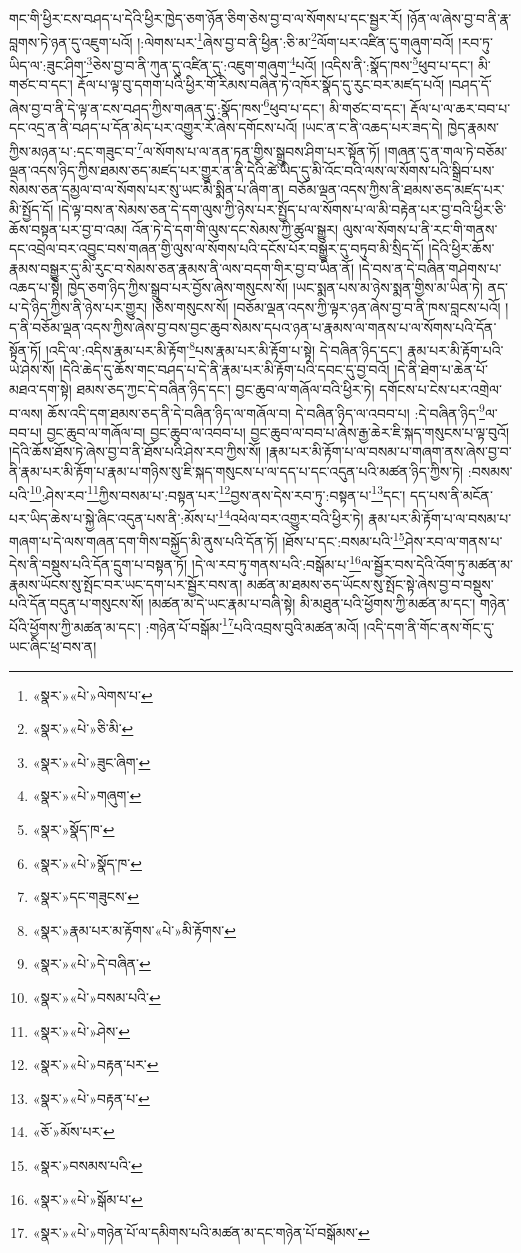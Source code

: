 གང་གི་ཕྱིར་ངས་བཤད་པ་དེའི་ཕྱིར་ཁྱེད་ཅག་ཉོན་ཅིག་ཅེས་བྱ་བ་ལ་སོགས་པ་དང་སྦྱར་རོ། །ཉོན་ལ་ཞེས་བྱ་བ་ནི་རྣ་བླགས་ཏེ་ཉན་དུ་འཇུག་པའོ། །:ལེགས་པར་\footnote{«སྣར་»«པེ་»ལེགས་པ་}ཞེས་བྱ་བ་ནི་ཕྱིན་:ཅི་མ་\footnote{«སྣར་»«པེ་»ཅི་མི་}ལོག་པར་འཛིན་དུ་གཞུག་བའོ། །རབ་ཏུ་ཡིད་ལ་:ཟུང་ཤིག་\footnote{«སྣར་»«པེ་»ཟུང་ཞིག་}ཅེས་བྱ་བ་ནི་ཀུན་དུ་འཛིན་དུ་:འཇུག་གཞུག་\footnote{«སྣར་»«པེ་»གཞུག་}པའོ། །འདིས་ནི་:སྣོད་ཁས་\footnote{«སྣར་»སྣོད་ཁ་}ཕུབ་པ་དང་། མི་གཙང་བ་དང་། རྡོལ་པ་ལྟ་བུ་དགག་པའི་ཕྱིར་གོ་རིམས་བཞིན་ཏེ་འཁོར་སྣོད་དུ་རུང་བར་མཛད་པའོ། །བཤད་དོ་ཞེས་བྱ་བ་ནི་དེ་ལྟ་ན་ངས་བཤད་ཀྱིས་གཞན་དུ་:སྣོད་ཁས་\footnote{«སྣར་»«པེ་»སྣོད་ཁ་}ཕུབ་པ་དང་། མི་གཙང་བ་དང་། རྡོལ་པ་ལ་ཆར་བབ་པ་དང་འདྲ་ན་ནི་བཤད་པ་དོན་མེད་པར་འགྱུར་རོ་ཞེས་དགོངས་པའོ། །ཡང་ན་ང་ནི་འཆད་པར་ཟད་དེ། ཁྱེད་རྣམས་ཀྱིས་མཉན་པ་:དང་གཟུང་བ་\footnote{«སྣར་»དང་གཟུངས་}ལ་སོགས་པ་ལ་ནན་ཏན་གྱིས་སྒྲུབས་ཤིག་པར་སྟོན་ཏོ། །གཞན་དུ་ན་གལ་ཏེ་བཅོམ་ལྡན་འདས་ཉིད་ཀྱིས་ཐམས་ཅད་མཛད་པར་གྱུར་ན་ནི་དེའི་ཚེ་ཡིད་དུ་མི་འོང་བའི་ལས་ལ་སོགས་པའི་སྒྲིབ་པས་སེམས་ཅན་དམྱལ་བ་ལ་སོགས་པར་སུ་ཡང་མི་སྨིན་པ་ཞིག་ན། བཅོམ་ལྡན་འདས་ཀྱིས་ནི་ཐམས་ཅད་མཛད་པར་མི་སྤྱོད་དོ། །དེ་ལྟ་བས་ན་སེམས་ཅན་དེ་དག་ལུས་ཀྱི་ཉེས་པར་སྤྱོད་པ་ལ་སོགས་པ་ལ་མི་བརྟེན་པར་བྱ་བའི་ཕྱིར་ཅི་ཆོས་བསྟན་པར་བྱ་བ་འམ། འོན་ཏེ་དེ་དག་གི་ལུས་དང་སེམས་ཀྱི་ཚུལ་སྒྱུར། ལུས་ལ་སོགས་པ་ནི་རང་གི་གནས་དང་འབྲེལ་བར་འབྱུང་བས་གཞན་གྱི་ལུས་ལ་སོགས་པའི་དངོས་པོར་བསྒྱུར་དུ་བཏུབ་མི་སྲིད་དོ། །དེའི་ཕྱིར་ཆོས་རྣམས་བསྒྱུར་དུ་མི་རུང་བ་སེམས་ཅན་རྣམས་ནི་ལས་བདག་གིར་བྱ་བ་ཡིན་ནོ། །དེ་བས་ན་དེ་བཞིན་གཤེགས་པ་འཆད་པ་སྟེ། ཁྱེད་ཅག་ཉིད་ཀྱིས་སྒྲུབ་པར་བྱོས་ཞེས་གསུངས་སོ། །ཡང་སྨན་པས་མ་ཉེས་སྨན་གྱིས་མ་ཡིན་ཏེ། ནད་པ་དེ་ཉིད་ཀྱིས་ནི་ཉེས་པར་གྱུར། །ཅེས་གསུངས་སོ། །བཅོམ་ལྡན་འདས་ཀྱི་ལྟར་ཉན་ཞེས་བྱ་བ་ནི་ཁས་བླངས་པའོ། །ད་ནི་བཅོམ་ལྡན་འདས་ཀྱིས་ཞེས་བྱ་བས་བྱང་ཆུབ་སེམས་དཔའ་ཉན་པ་རྣམས་ལ་གནས་པ་ལ་སོགས་པའི་དོན་སྟོན་ཏོ། །འདི་ལ་:འདིས་རྣམ་པར་མི་རྟོག་\footnote{«སྣར་»རྣམ་པར་མ་རྟོགས་«པེ་»མི་རྟོགས་}པས་རྣམ་པར་མི་རྟོག་པ་སྟེ། དེ་བཞིན་ཉིད་དང་། རྣམ་པར་མི་རྟོག་པའི་ཡེ་ཤེས་སོ། །དེའི་ཆེད་དུ་ཆོས་གང་བཤད་པ་དེ་ནི་རྣམ་པར་མི་རྟོག་པའི་དབང་དུ་བྱ་བའོ། །དེ་ནི་ཐེག་པ་ཆེན་པོ་མཐའ་དག་སྟེ། ཐམས་ཅད་ཀྱང་དེ་བཞིན་ཉིད་དང་། བྱང་ཆུབ་ལ་གཞོལ་བའི་ཕྱིར་ཏེ། དགོངས་པ་ངེས་པར་འགྲེལ་བ་ལས། ཆོས་འདི་དག་ཐམས་ཅད་ནི་དེ་བཞིན་ཉིད་ལ་གཞོལ་བ། དེ་བཞིན་ཉིད་ལ་འབབ་པ། :དེ་བཞིན་ཉིད་\footnote{«སྣར་»«པེ་»དེ་བཞིན་}ལ་བབ་པ། བྱང་ཆུབ་ལ་གཞོལ་བ། བྱང་ཆུབ་ལ་འབབ་པ། བྱང་ཆུབ་ལ་བབ་པ་ཞེས་རྒྱ་ཆེར་ཇི་སྐད་གསུངས་པ་ལྟ་བུའོ། །དེའི་ཆོས་ཐོས་ཏེ་ཞེས་བྱ་བ་ནི་ཐོས་པའི་ཤེས་རབ་ཀྱིས་སོ། །རྣམ་པར་མི་རྟོག་པ་ལ་བསམ་པ་གཞག་ནས་ཞེས་བྱ་བ་ནི་རྣམ་པར་མི་རྟོག་པ་རྣམ་པ་གཉིས་སུ་ཇི་སྐད་གསུངས་པ་ལ་དད་པ་དང་འདུན་པའི་མཚན་ཉིད་ཀྱིས་ཏེ། :བསམས་པའི་\footnote{«སྣར་»«པེ་»བསམ་པའི་}:ཤེས་རབ་\footnote{«སྣར་»«པེ་»ཤེས་}ཀྱིས་བསམ་པ་:བསྟན་པར་\footnote{«སྣར་»«པེ་»བརྟན་པར་}བྱས་ནས་དེས་རབ་ཏུ་:བསྟན་པ་\footnote{«སྣར་»«པེ་»བརྟན་པ་}དང་། དད་པས་ནི་མངོན་པར་ཡིད་ཆེས་པ་སྐྱེ་ཞིང་འདུན་པས་ནི་:མོས་པ་\footnote{«ཅོ་»མོས་པར་}འཕེལ་བར་འགྱུར་བའི་ཕྱིར་ཏེ། རྣམ་པར་མི་རྟོག་པ་ལ་བསམ་པ་གཞག་པ་དེ་ལས་གཞན་དག་གིས་བསྐྱོད་མི་ནུས་པའི་དོན་ཏོ། །ཐོས་པ་དང་:བསམ་པའི་\footnote{«སྣར་»བསམས་པའི་}ཤེས་རབ་ལ་གནས་པ་དེས་ནི་བསྡུས་པའི་དོན་དྲུག་པ་བསྟན་ཏོ། །དེ་ལ་རབ་ཏུ་གནས་པའི་:བསྒོམ་པ་\footnote{«སྣར་»«པེ་»སྒོམ་པ་}ལ་སྦྱོར་བས་དེའི་འོག་ཏུ་མཚན་མ་རྣམས་ཡོངས་སུ་སྤོང་བར་ཡང་དག་པར་སྦྱོར་བས་ན། མཚན་མ་ཐམས་ཅད་ཡོངས་སུ་སྤོང་སྟེ་ཞེས་བྱ་བ་བསྡུས་པའི་དོན་བདུན་པ་གསུངས་སོ། །མཚན་མ་དེ་ཡང་རྣམ་པ་བཞི་སྟེ། མི་མཐུན་པའི་ཕྱོགས་ཀྱི་མཚན་མ་དང་། གཉེན་པོའི་ཕྱོགས་ཀྱི་མཚན་མ་དང་། :གཉེན་པོ་བསྒོམ་\footnote{«སྣར་»«པེ་»གཉེན་པོ་ལ་དམིགས་པའི་མཚན་མ་དང་གཉེན་པོ་བསྒོམས་}པའི་འབྲས་བུའི་མཚན་མའོ། །འདི་དག་ནི་གོང་ནས་གོང་དུ་ཡང་ཞིང་ཕྲ་བས་ན། 